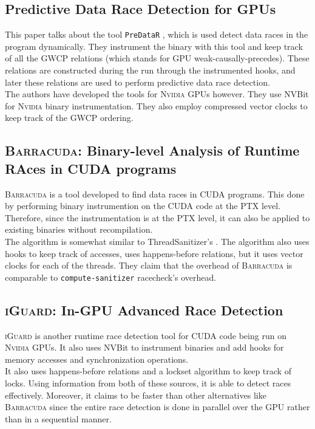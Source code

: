 \documentclass{btp}
\begin{document}
\subsection{Predictive Data Race Detection for GPUs}

This paper talks about the tool \texttt{PreDataR} \cite{iitk}, which is used detect data races in the program dynamically. They instrument the binary with this tool and keep track of all the GWCP relations (which stands for GPU weak-causally-precedes). These relations are constructed during the run through the instrumented hooks, and later these relations are used to perform predictive data race detection.
\\
\newline
The authors have developed the tools for \textsc{Nvidia} GPUs however. They use NVBit for \textsc{Nvidia} binary instrumentation. They also employ compressed vector clocks to keep track of the GWCP ordering.

\subsection{\textsc{Barracuda}: Binary-level Analysis of Runtime RAces in CUDA programs}

\textsc{Barracuda} \cite{barracuda} is a tool developed to find data races in CUDA programs. This done by performing binary instrumention on the CUDA code at the PTX level. Therefore, since the instrumentation is at the PTX level, it can also be applied to existing binaries without recompilation.
\\
\newline
The algorithm is somewhat similar to ThreadSanitizer's . The algorithm also uses hooks to keep track of accesses, uses happens-before relations, but it uses vector clocks for each of the threads. They claim that the overhead of \textsc{Barracuda} is comparable to \texttt{compute-sanitizer} racecheck's overhead.

\subsection{\textsc{iGuard}: In-GPU Advanced Race Detection}

\textsc{iGuard} \cite{iguard} is another runtime race detection tool for CUDA code being run on \textsc{Nvidia} GPUs. It also uses NVBit to instrument binaries and add hooks for memory accesses and synchronization operations.
\\
\newline
It also uses happens-before relations and a lockset algorithm to keep track of locks. Using information from both of these sources, it is able to detect races effectively. Moreover, it claims to be faster than other alternatives like \textsc{Barracuda} since the entire race detection is done in parallel over the GPU rather than in a sequential manner.
\end{document}
